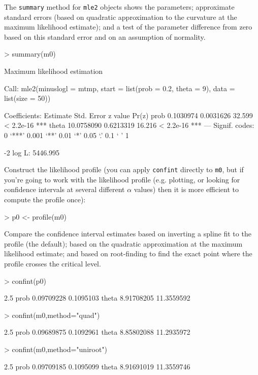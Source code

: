 \documentclass{article}
\newcommand{\code}[1]{{\tt #1}}
\begin{document}
The \code{summary} method for \code{mle2} objects
shows the parameters; approximate standard
errors (based on quadratic approximation to the curvature at
the maximum likelihood estimate); and a test
of the parameter difference from zero based on
this standard error and on an assumption of normality.

\begin{Schunk}
\begin{Sinput}
> summary(m0)
\end{Sinput}
\begin{Soutput}
Maximum likelihood estimation

Call:
mle2(minuslogl = mtmp, start = list(prob = 0.2, theta = 9), data = list(size = 50))

Coefficients:
        Estimate Std. Error z value     Pr(z)    
prob   0.1030974  0.0031626  32.599 < 2.2e-16 ***
theta 10.0758090  0.6213319  16.216 < 2.2e-16 ***
---
Signif. codes:  0 ‘***’ 0.001 ‘**’ 0.01 ‘*’ 0.05 ‘.’ 0.1 ‘ ’ 1 

-2 log L: 5446.995 
\end{Soutput}
\end{Schunk}

Construct the likelihood profile (you can
apply \code{confint} directly to \code{m0},
but if you're going to work with the likelihood
profile (e.g. plotting, or looking for confidence
intervals at several different $\alpha$ values)
then it is more efficient to compute the profile
once):

\begin{Schunk}
\begin{Sinput}
> p0 <- profile(m0)
\end{Sinput}
\end{Schunk}

Compare the confidence interval estimates based on
inverting a spline fit to the profile (the default);
based on the quadratic approximation at the
maximum likelihood estimate; and based on
root-finding to find the exact point where the
profile crosses the critical level.

\begin{Schunk}
\begin{Sinput}
> confint(p0)
\end{Sinput}
\begin{Soutput}
           2.5 %
prob  0.09709228  0.1095103
theta 8.91708205 11.3559592
\end{Soutput}
\begin{Sinput}
> confint(m0,method="quad")
\end{Sinput}
\begin{Soutput}
           2.5 %
prob  0.09689875  0.1092961
theta 8.85802088 11.2935972
\end{Soutput}
\begin{Sinput}
> confint(m0,method="uniroot")
\end{Sinput}
\begin{Soutput}
           2.5 %
prob  0.09709185  0.1095099
theta 8.91691019 11.3559746
\end{Soutput}
\end{Schunk}
\end{document}
